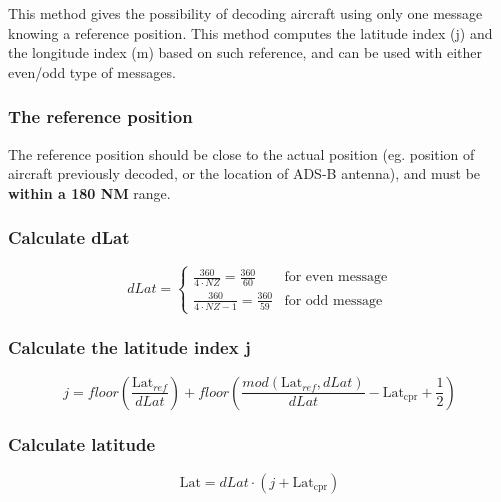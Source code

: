 This method gives the possibility of decoding aircraft using only one message knowing a reference position. This method computes the latitude index (j) and the longitude index (m) based on such reference, and can be used with either even/odd type of messages.

\subsubsection{The reference position}\label{the-reference-position}

The reference position should be close to the actual position (eg. position of aircraft previously decoded, or the location of ADS-B antenna), and must be \textbf{within a 180 NM} range.

\subsubsection{Calculate dLat}\label{calculate-dlat}

\begin{equation}
  dLat =
  \begin{cases}
   \frac{360}{4 \cdot NZ} = \frac{360}{60}          & \text{for even message}  \\
   \frac{360}{4 \cdot NZ - 1}  = \frac{360}{59}     & \text{for odd message}
  \end{cases}
\end{equation}

\subsubsection{Calculate the latitude index j} \label{calculate-the-latitude-index-j-1}

\begin{equation}
  j = floor \left (\frac{\mathrm{Lat}_{ref}}{dLat} \right) + floor \left( \frac{mod(\mathrm{Lat}_{ref}, dLat)}{dLat}  - \mathrm{Lat}_\mathrm{cpr}  + \frac{1}{2} \right)
\end{equation}

\subsubsection{Calculate latitude}\label{calculate-latitude-1}

\begin{equation}
  \mathrm{Lat} = dLat \cdot (j + \mathrm{Lat}_\mathrm{cpr})
\end{equation}


